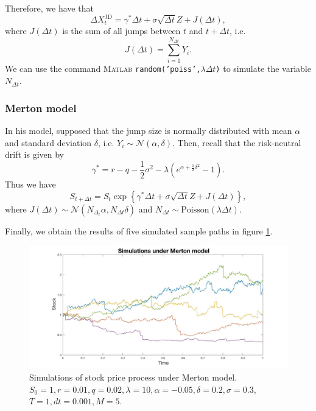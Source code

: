 Therefore, we have that
$$\Delta X_t^\text{JD} = \gamma^\ast \Delta t + \sigma \sqrt{\Delta t} Z + J(\Delta t),$$
where $J(\Delta t)$ is the sum of all jumps between $t$ and $t+\Delta t$, i.e.
$$J(\Delta t)=\sum_{i=1}^{N_{\Delta t}}Y_i.$$
We can use the command \textsc{Matlab} \texttt{random('poiss',$\lambda \Delta t$)} to simulate the variable $N_{\Delta t}$.
\subsubsection{Merton model}
In his model, \citeauthor{Mer76} supposed that the jump size is normally distributed with mean $\alpha$ and standard deviation $\delta$, i.e. $Y_i\sim\mathcal{N}(\alpha,\delta)$. Then, recall that the risk-neutral drift is given by
$$\gamma^\ast = r-q-\frac{1}{2}\sigma^2-\lambda\left(e^{\alpha+\frac{1}{2}\delta^2}-1\right).$$
Thus we have
$$S_{t+\Delta t} = S_t\exp\left\{\gamma^\ast \Delta t + \sigma \sqrt{\Delta t}Z + J(\Delta t)\right\},$$
where $J(\Delta t)\sim\mathcal{N}(N_{\Delta_t}\alpha,N_{\Delta t}\delta)$ and $N_{\Delta t}\sim\text{Poisson}(\lambda\Delta t)$.

Finally, we obtain the results of five simulated sample paths in figure \ref{fig:MC:Mer}.
\begin{figure}[!htb]
	\includegraphics[width=\textwidth]{gfx/Merton_plot}
	\caption{Simulations of stock price process under Merton model.\\ $S_0=1, r= 0.01,q = 0.02,\lambda = 10 , \alpha = -0.05, \delta = 0.2, \sigma=0.3,$\\$T = 1, dt = 0.001, M=5$.}
	\label{fig:MC:Mer}
\end{figure}

\newpage
